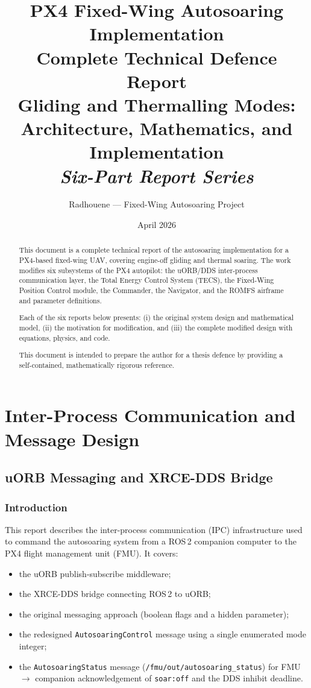 \documentclass[12pt,a4paper]{report}
\title{%
  \textbf{\Large PX4 Fixed-Wing Autosoaring Implementation}\\[1em]
  \large Complete Technical Defence Report\\[0.5em]
  \normalsize Gliding and Thermalling Modes: Architecture, Mathematics, and Implementation\\[2em]
  \textit{Six-Part Report Series}
}
\author{Radhouene --- Fixed-Wing Autosoaring Project}
\date{April 2026}
\begin{document}
\maketitle

\begin{abstract}
This document is a complete technical report of the autosoaring
implementation for a PX4-based fixed-wing UAV, covering engine-off gliding
and thermal soaring. The work modifies six subsystems of the PX4 autopilot:
the uORB/DDS inter-process communication layer, the Total Energy Control
System (TECS), the Fixed-Wing Position Control module, the Commander, the
Navigator, and the ROMFS airframe and parameter definitions.

Each of the six reports below presents: (i) the original system design and
mathematical model, (ii) the motivation for modification, and (iii) the
complete modified design with equations, physics, and code.

This document is intended to prepare the author for a thesis defence by
providing a self-contained, mathematically rigorous reference.
\end{abstract}

\tableofcontents
\listoftables

\newpage

\part{Inter-Process Communication and Message Design}

\chapter{uORB Messaging and XRCE-DDS Bridge}

\section{Introduction}

This report describes the inter-process communication (IPC) infrastructure
used to command the autosoaring system from a ROS\,2 companion computer to
the PX4 flight management unit (FMU). It covers:
\begin{itemize}
  \item the uORB publish-subscribe middleware;
  \item the XRCE-DDS bridge connecting ROS\,2 to uORB;
  \item the original messaging approach (boolean flags and a hidden parameter);
  \item the redesigned \texttt{AutosoaringControl} message using a single
        enumerated mode integer;
  \item the \texttt{AutosoaringStatus} message (\texttt{/fmu/out/autosoaring\_status})
        for FMU $\rightarrow$ companion acknowledgement of \texttt{soar:off} and
        the DDS inhibit deadline.
\end{itemize}
\end{document}
